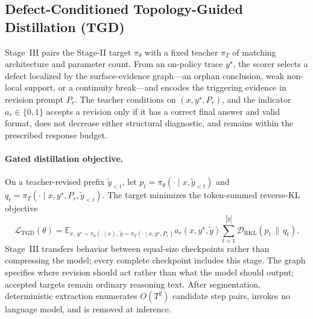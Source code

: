 \subsection{Defect-Conditioned Topology-Guided Distillation (TGD)}
\label{sec:distillation}

Stage~III pairs the Stage-II target $\pi_\theta$ with a fixed teacher $\pi_T$ of matching architecture and parameter count. From an on-policy trace $y^{\star}$, the scorer selects a defect localized by the surface-evidence graph---an orphan conclusion, weak non-local support, or a continuity break---and encodes the triggering evidence in revision prompt $P_r$. The teacher conditions on $(x,y^{\star},P_r)$, and the indicator $a_r\in\{0,1\}$ accepts a revision only if it has a correct final answer and valid format, does not decrease either structural diagnostic, and remains within the prescribed response budget.

\paragraph{Gated distillation objective.}
On a teacher-revised prefix $\widetilde y_{<t}$, let $p_t=\pi_\theta(\cdot\mid x,\widetilde y_{<t})$ and $q_t=\pi_T(\cdot\mid x,y^{\star},P_r,\widetilde y_{<t})$. The target minimizes the token-summed reverse-KL objective
\begin{equation}
\label{eq:tgd}
\mathcal{L}_{\mathrm{TGD}}(\theta)=
\mathbb{E}_{x,\,y^{\star}\sim\pi_\theta(\cdot\mid x),\,
\widetilde y\sim\pi_T(\cdot\mid x,y^{\star},P_r)}
a_r(x,y^{\star},\widetilde y)\sum_{t=1}^{|\widetilde y|}
\mathcal{D}_{\mathrm{RKL}}\!\left(p_t\,\|\,q_t\right).
\end{equation}
Stage~III transfers behavior between equal-size checkpoints rather than compressing the model; every complete \method checkpoint includes this stage. The graph specifies where revision should act rather than what the model should output; accepted targets remain ordinary reasoning text. After segmentation, deterministic extraction enumerates $O(T^2)$ candidate step pairs, invokes no language model, and is removed at inference.
